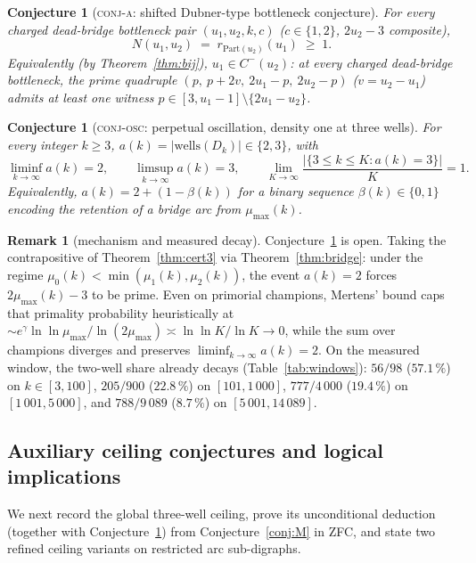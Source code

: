 \documentclass[11pt]{article}
\theoremstyle{plain}
\newtheorem{conjecture}[theorem]{Conjecture}
\theoremstyle{definition}
\newtheorem{remark}[theorem]{Remark}
\newcommand{\Dk}{D_{k}}
\newcommand{\wells}{\mathrm{wells}}
\begin{document}
\begin{conjecture}[\textsc{conj-a}: shifted Dubner-type bottleneck conjecture]
\label{conj:A}
For every charged dead-bridge bottleneck pair $(u_1,u_2,k,c)$
($c \in \{1,2\}$, $2u_2 - 3$ composite),
\[
N(u_1,u_2) \;=\; r_{\mathrm{Part}(u_2)}(u_1) \;\ge\; 1.
\]
Equivalently (by Theorem~\ref{thm:bij}), $u_1 \in C^{-}(u_2)$: at
every charged dead-bridge bottleneck, the prime quadruple
$(p,\ p+2v,\ 2u_1-p,\ 2u_2-p)$ ($v = u_2 - u_1$) admits at least
one witness $p \in [3, u_1 - 1] \setminus \{2u_1 - u_2\}$.
\end{conjecture}

\begin{conjecture}[\textsc{conj-osc}: perpetual oscillation, density one at three wells]
\label{conj:OSC}
For every integer $k \ge 3$, $a(k) = |\wells(\Dk)| \in \{2,3\}$, with
\[
\liminf_{k \to \infty} a(k) = 2, \qquad
\limsup_{k \to \infty} a(k) = 3, \qquad
\lim_{K \to \infty} \frac{|\{3 \le k \le K : a(k) = 3\}|}{K} = 1 .
\]
Equivalently, $a(k) = 2 + (1 - \beta(k))$ for a binary sequence
$\beta(k) \in \{0,1\}$ encoding the retention of a bridge arc from
$\mu_{\max}(k)$.
\end{conjecture}

\begin{remark}[mechanism and measured decay]\label{rem:oscdecay}
Conjecture~\ref{conj:OSC} is open. Taking the contrapositive
of Theorem~\ref{thm:cert3} via Theorem~\ref{thm:bridge}: under the regime
$\mu_0(k) < \min(\mu_1(k),\mu_2(k))$, the event $a(k) = 2$ forces
$2\mu_{\max}(k) - 3$ to be prime. Even on primorial champions,
Mertens' bound caps that primality probability heuristically at
$\sim e^\gamma \ln\ln \mu_{\max} / \ln(2\mu_{\max})
\asymp \ln\ln K / \ln K \to 0$, while the sum over champions
diverges and preserves $\liminf_{k\to\infty} a(k) = 2$. On the
measured window, the two-well share already decays
(Table~\ref{tab:windows}): $56/98$ ($57.1\,\%$) on $k \in [3,100]$,
$205/900$ ($22.8\,\%$) on $[101,1\,000]$, $777/4\,000$ ($19.4\,\%$)
on $[1\,001,5\,000]$, and $788/9\,089$ ($8.7\,\%$) on
$[5\,001,14\,089]$.
\end{remark}

\subsection{Auxiliary ceiling conjectures and logical implications}

We next record the global three-well ceiling, prove its unconditional
deduction (together with Conjecture~\ref{conj:A}) from
Conjecture~\ref{conj:M} in ZFC, and state two refined ceiling
variants on restricted arc sub-digraphs.
\end{document}
